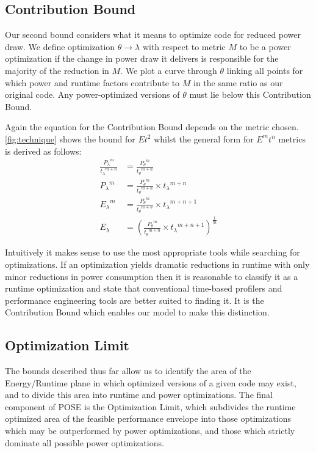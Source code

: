 \subsection{Contribution Bound}
Our second bound considers what it means to optimize code for reduced power draw. 
We define optimization $\theta \to \lambda$ with respect to metric $M$ to be a power optimization if the change in power draw it delivers is responsible for the majority of the reduction in $M$. We plot a curve through $\theta$ linking all points for which power and runtime factors contribute to $M$ in the same ratio as our original code. Any power-optimized versions of $\theta$ must lie below this Contribution Bound.

Again the equation for the Contribution Bound depends on the metric chosen. 
\autoref{fig:technique} shows the bound for $Et^2$ whilst the general form for $E^mt^n$ metrics is derived as follows:
\begin{align}
\frac{{P_{\lambda}}^m}{{t_{\lambda}}^{m+n}} &= \frac{{P_{\theta}}^m}{{t_{\theta}}^{m+n}} \nonumber \\
 {P_{\lambda}}^m &= \frac{{P_{\theta}}^m}{{t_{\theta}}^{m+n}} \times {t_\lambda}^{m+n} \nonumber \\ 
 {E_{\lambda}}^m &= \frac{{P_{\theta}}^m}{{t_{\theta}}^{m+n}} \times {t_\lambda}^{m+n+1} \nonumber \\ 
  E_{\lambda} &= (\frac{{P_{\theta}}^m}{{t_{\theta}}^{m+n}} \times {t_\lambda}^{m+n+1})^{\frac{1}{m}} 
\end{align}

Intuitively it makes sense to use the most appropriate tools while searching for optimizations.  If an optimization yields dramatic reductions in runtime with only minor reductions in power consumption then it is reasonable to classify it as a runtime optimization and state that conventional time-based profilers and performance engineering tools are better suited to finding it. It is the Contribution Bound which enables our model to make this distinction.
\subsection{Optimization Limit}
The bounds described thus far allow us to identify the area of the Energy/Runtime plane in which optimized versions of a given code may exist, and to divide this area into runtime and power optimizations. The final component of POSE is the Optimization Limit, which subdivides the runtime optimized area of the feasible performance envelope into those optimizations which may be outperformed by power optimizations, and those which strictly dominate all possible power optimizations.


